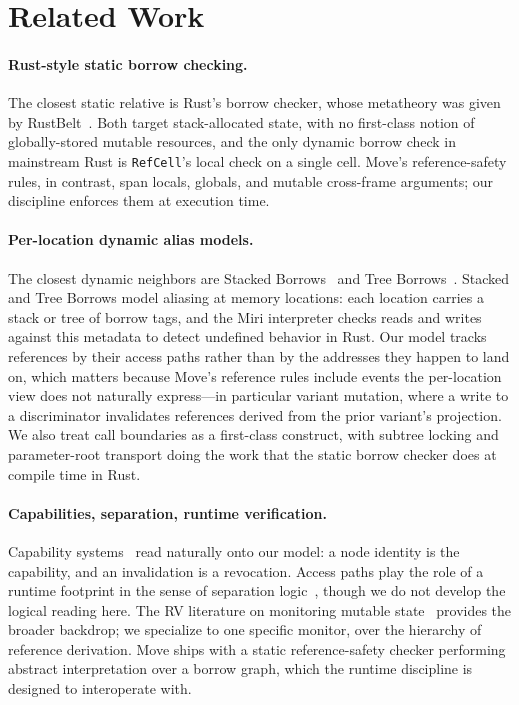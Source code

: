 \section{Related Work}\label{sec:related}

\paragraph{Rust-style static borrow checking.}
The closest static relative is Rust's borrow checker, whose
metatheory was given by RustBelt~\cite{rustbelt}. Both target
stack-allocated state, with no first-class notion of globally-stored
mutable resources, and the only dynamic borrow check in mainstream
Rust is \texttt{RefCell}'s local check on a single cell. Move's
reference-safety rules, in contrast, span locals, globals, and
mutable cross-frame arguments; our discipline enforces them at
execution time.

\paragraph{Per-location dynamic alias models.}
The closest dynamic neighbors are Stacked Borrows~\cite{stackedborrows}
and Tree Borrows~\cite{treeborrows}. Stacked and Tree Borrows model
aliasing at memory locations: each location carries a stack or tree
of borrow tags, and the Miri interpreter checks reads and writes
against this metadata to detect undefined behavior in Rust. Our
model tracks references by their access paths rather than by the
addresses they happen to land on, which matters because Move's
reference rules include events the per-location view does not
naturally express---in particular variant mutation, where a write
to a discriminator invalidates references derived from the prior
variant's projection. We also treat call boundaries as a first-class
construct, with subtree locking and parameter-root transport doing
the work that the static borrow checker does at compile time in
Rust.

\paragraph{Capabilities, separation, runtime verification.}
Capability systems~\cite{capabilities} read naturally onto our model:
a node identity is the capability, and an invalidation is a
revocation. Access paths play the role of a runtime footprint in the
sense of separation logic~\cite{seplogic}, though we do not develop
the logical reading here. The RV literature on monitoring mutable
state~\cite{rvsurvey} provides the broader backdrop; we specialize
to one specific monitor, over the hierarchy of reference derivation.
Move ships with a static reference-safety checker performing abstract
interpretation over a borrow graph, which the runtime discipline is
designed to interoperate with.
